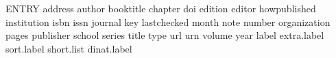 ENTRY
  { address      %
    author       %
    booktitle    %
    chapter      %
    doi          %
    edition      %
    editor       %
    howpublished %
    institution  %
    isbn         %
    issn         %
    journal      %
    key          %
    lastchecked  %
    month        %
    note         %
    number       %
    organization %
    pages        %
    publisher    %
    school       %
    series       %
    title        %
    type         %
    url          %
    urn          %
    volume       %
    year         %
  }
  {}
  { label extra.label sort.label short.list dinat.label}

